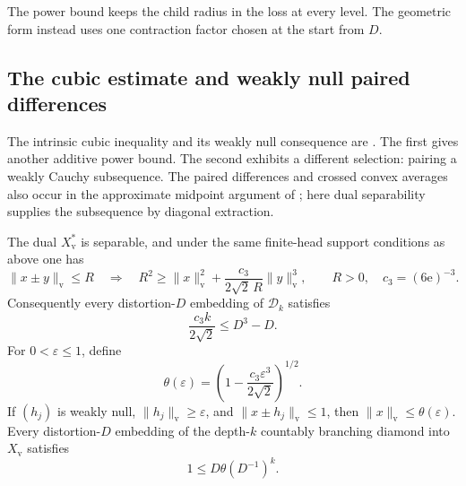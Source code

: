 The power bound keeps the child radius in the loss at every level.
The geometric form instead uses one contraction factor chosen at the
start from $D$.

\subsection{The cubic estimate and weakly null paired differences}

The intrinsic cubic inequality and its weakly null consequence are
\cite[Theorem~7.6 and Proposition~7.7]{RecursivePotentials}.
The first gives another additive power bound. The second exhibits a
different selection: pairing a weakly Cauchy subsequence. The paired
differences and crossed convex averages also occur in the approximate
midpoint argument of \cite[proof of Corollary~2.3]{DKRRZ2016}; here
dual separability supplies the subsequence by diagonal extraction.

\begin{proposition}\label{met:f:cubic-weak}
The dual $X_{\mathrm v}^*$ is separable, and under the same
finite-head support conditions as above one has
\begin{equation}\label{met:f:cubic-input}
 \|x\pm y\|_{\mathrm v}\le R
 \quad\Longrightarrow\quad
 R^2\ge\|x\|_{\mathrm v}^2+
       \frac{c_3}{2\sqrt2\,R}\|y\|_{\mathrm v}^3,
 \qquad R>0,\quad c_3=(6\mathrm e)^{-3}.
\end{equation}
Consequently every distortion-$D$ embedding of $\mathcal D_k$ satisfies
\begin{equation}\label{met:f:cubic-power-depth}
 \frac{c_3 k}{2\sqrt2}\le D^3-D.
\end{equation}
For $0<\varepsilon\le1$, define
\begin{equation}\label{met:f:cubic-theta}
 \theta(\varepsilon)=
 \left(1-\frac{c_3\varepsilon^3}{2\sqrt2}\right)^{1/2}.
\end{equation}
If $(h_j)$ is weakly null, $\|h_j\|_{\mathrm v}\ge\varepsilon$,
and $\|x\pm h_j\|_{\mathrm v}\le1$, then
$\|x\|_{\mathrm v}\le\theta(\varepsilon)$.
Every distortion-$D$ embedding of the depth-$k$ countably branching
diamond into $X_{\mathrm v}$ satisfies
\begin{equation}\label{met:f:cubic-depth}
 1\le D\theta(D^{-1})^k.
\end{equation}
\end{proposition}


